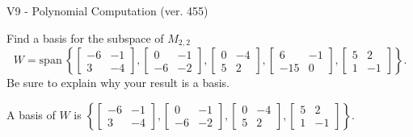\begin{exercise}
  \begin{exerciseTitle}V9 - Polynomial Computation (ver. 455)\end{exerciseTitle}
  \begin{exerciseStatement}
    Find a basis for the subspace of \(M_{2,2}\) 
\[W=\mathrm{span}\ \left\{\left[\begin{array}{cc}
-6 & -1 \\
3 & -4
\end{array}\right] , \left[\begin{array}{cc}
0 & -1 \\
-6 & -2
\end{array}\right] , \left[\begin{array}{cc}
0 & -4 \\
5 & 2
\end{array}\right] , \left[\begin{array}{cc}
6 & -1 \\
-15 & 0
\end{array}\right] , \left[\begin{array}{cc}
5 & 2 \\
1 & -1
\end{array}\right]\right\}.\]
 Be sure to explain why your result is a basis.


  \end{exerciseStatement}
  \begin{exerciseAnswer}
   A basis of \(W\) is  \(\left\{\left[\begin{array}{cc}
-6 & -1 \\
3 & -4
\end{array}\right] , \left[\begin{array}{cc}
0 & -1 \\
-6 & -2
\end{array}\right] , \left[\begin{array}{cc}
0 & -4 \\
5 & 2
\end{array}\right] , \left[\begin{array}{cc}
5 & 2 \\
1 & -1
\end{array}\right]\right\}\).
  


  \end{exerciseAnswer}
\end{exercise}